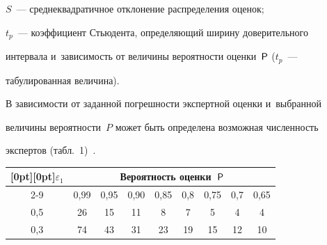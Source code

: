 $S$~--- среднеквадратичное отклонение распределения оценок;

$t_p$~--- коэффициент Стьюдента, определяющий ширину доверительного 

интервала и~зависимость от величины вероятности оценки~${\sf P}$ ($t_p$~--- 

табулированная величина). 

  

  В зависимости от заданной погрешности экспертной оценки и~выбранной 

величины вероятности~$P$ может быть определена возможная численность 

экспертов (табл.~1)~\cite{10-zac}.

  

\begin{table}[b]\small %

\vspace*{-9pt}

\begin{center}


\vspace*{2ex}



\tabcolsep=7pt

\begin{tabular}{|c|c|c|c|c|c|c|c|c|}

\hline

  \multicolumn{1}{|c|}{\raisebox{-6pt}[0pt][0pt]{$\varepsilon_1$}}&\multicolumn{8}{c|}{Вероятность оценки~${\sf P}$}\\

  \cline{2-9}

  &0,99&0,95&0,90&0,85&0,8&0,75&0,7&0,65\\

  \hline

  0,5&26&15&11&\hphantom{9}8&\hphantom{9}7&\hphantom{9}5&\hphantom{9}4&\hphantom{9}4\\

  0,3&74&43&31&23&19&15&12&10\\

  \hline

  \end{tabular}

  \end{center}


  \end{table}

